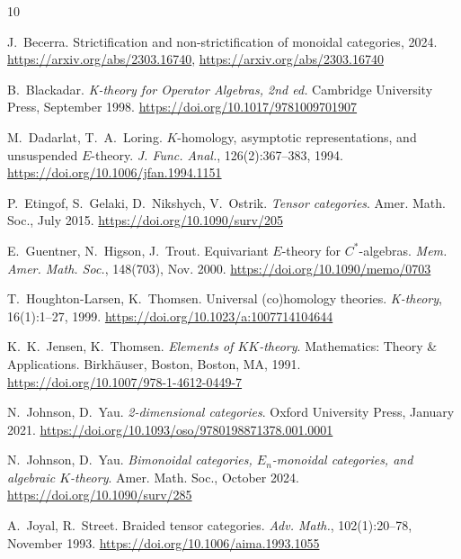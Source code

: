 \documentclass[10pt]{simplearticle}
\begin{document}
\begin{thebibliography}{10}

J.~Becerra.
\newblock Strictification and non-strictification of monoidal categories, 2024.
\newblock \url{https://arxiv.org/abs/2303.16740},
  \url{https://arxiv.org/abs/2303.16740}

B.~Blackadar.
\newblock \emph{K-theory for Operator Algebras, 2nd ed.}
\newblock Cambridge University Press, September 1998.
\newblock \url{https://doi.org/10.1017/9781009701907}

M.~Dadarlat, T.~A.~Loring.
\newblock ${K}$-homology, asymptotic representations, and unsuspended
  ${E}$-theory.
\newblock \emph{J. Func. Anal.}, 126(2):367--383, 1994.
\newblock \url{https://doi.org/10.1006/jfan.1994.1151}

P.~Etingof, S.~Gelaki, D.~Nikshych, V.~Ostrik.
\newblock \emph{Tensor categories}.
\newblock Amer. Math. Soc., July 2015.
\newblock \url{https://doi.org/10.1090/surv/205}

E.~Guentner, N.~Higson, J.~Trout.
\newblock Equivariant ${E}$-theory for ${C^*}$-algebras.
\newblock \emph{Mem. Amer. Math. Soc.}, 148(703), Nov. 2000.
\newblock \url{https://doi.org/10.1090/memo/0703}

T.~Houghton-Larsen, K.~Thomsen.
\newblock Universal (co)homology theories.
\newblock \emph{K-theory}, 16(1):1--27, 1999.
\newblock \url{https://doi.org/10.1023/a:1007714104644}

K.~K.~Jensen, K.~Thomsen.
\newblock \emph{Elements of ${KK}$-theory}.
\newblock Mathematics: Theory \& Applications. Birkh{\"a}user, Boston, Boston,
  MA, 1991.
\newblock \url{https://doi.org/10.1007/978-1-4612-0449-7}

N.~Johnson, D.~Yau.
\newblock \emph{2-dimensional categories}.
\newblock Oxford University Press, January 2021.
\newblock \url{https://doi.org/10.1093/oso/9780198871378.001.0001}

N.~Johnson, D.~Yau.
\newblock \emph{Bimonoidal categories, $E_{n}$-monoidal categories, and
  algebraic $K$-theory}.
\newblock Amer. Math. Soc., October 2024.
\newblock \url{https://doi.org/10.1090/surv/285}

A.~Joyal, R.~Street.
\newblock Braided tensor categories.
\newblock \emph{Adv. Math.}, 102(1):20–78, November 1993.
\newblock \url{https://doi.org/10.1006/aima.1993.1055}


\end{thebibliography}
\end{document}
